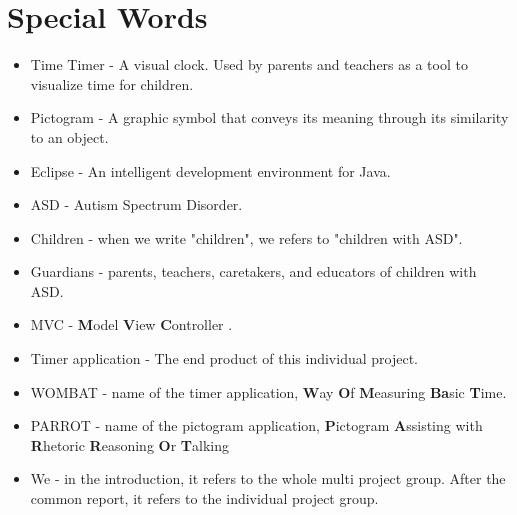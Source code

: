 \chapter*{Special Words}

\begin{itemize}

	\item Time Timer - A visual clock. Used by parents and teachers as a tool to visualize time for children.
	\item Pictogram - A graphic symbol that conveys its meaning through its similarity to an object.
	\item Eclipse - An intelligent development environment for Java.
	\item ASD - Autism Spectrum Disorder.
	\item Children - when we write "children", we refers to "children with ASD".
	\item Guardians - parents, teachers, caretakers, and educators of children with ASD.
	\item MVC - \textbf{M}odel \textbf{V}iew \textbf{C}ontroller \cite{MVC}.
	\item Timer application - The end product of this individual project.
	\item WOMBAT - name of the timer application, \textbf{W}ay \textbf{O}f \textbf{M}easuring \textbf{Ba}sic \textbf{T}ime.
	\item PARROT - name of the pictogram application, \textbf{P}ictogram \textbf{A}ssisting with \textbf{R}hetoric \textbf{R}easoning \textbf{O}r \textbf{T}alking
	\item We - in the introduction, it refers to the whole multi project group. After the common report, it refers to the individual project group.

\end{itemize}